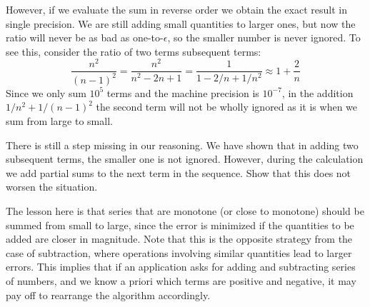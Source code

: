 However, if we evaluate the sum in reverse order
we obtain the exact result in single precision. We are still adding
small quantities to larger ones, but now the ratio will never be as
bad as one-to-$\epsilon$, so the smaller number is never ignored.
To see this,
consider the ratio of two terms subsequent terms:
\begin{equation}
  \frac{n^2}{(n-1)^2}=\frac{n^2}{n^2-2n+1}=\frac1{1-2/n+1/n^2}
    \approx 1+\frac2n
\end{equation}
Since we only sum $10^5$ terms and the machine precision is $10^{-7}$, 
in the addition $1/n^2+1/(n-1)^2$ the second term will not be wholly
ignored as it is when we sum from large to small.
\begin{exercise}
  There is still a step missing in our reasoning. We have shown that
  in adding two subsequent terms, the smaller one is not
  ignored. However, during the calculation we add partial sums to the
  next term in the sequence. Show that this does not worsen the situation.
\end{exercise}

The lesson here is that series that are monotone (or close to
monotone) should be summed from small to large, since the error is
minimized if the quantities to be added are closer in magnitude. Note
that this is the opposite strategy from the case of subtraction, where
operations involving similar quantities lead to larger errors. This
implies that if an application asks for adding and subtracting series
of numbers, and we know a priori which terms are positive and
negative, it may pay off to rearrange the algorithm accordingly.


